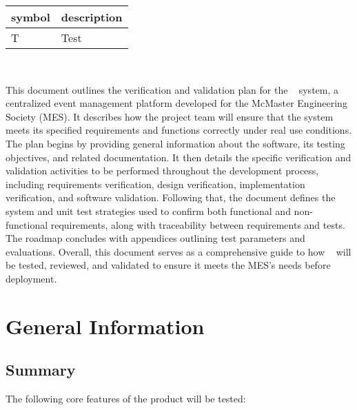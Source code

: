 \documentclass[12pt, titlepage]{article}
\begin{document}
\renewcommand{\arraystretch}{1.2}
\begin{tabular}{l l}
  \toprule
  \textbf{symbol} & \textbf{description}\\
  \midrule
  T & Test\\
  \bottomrule
\end{tabular}\\



\newpage


This document outlines the verification and validation plan for the \teamname~ system, a centralized event management
platform developed for the McMaster Engineering Society (MES). It describes how the project team will ensure that the
system meets its specified requirements and functions correctly under real use conditions. The plan begins by providing
general information about the software, its testing objectives, and related documentation. It then details the specific
verification and validation activities to be performed throughout the development process, including requirements
verification, design verification, implementation verification, and software validation. Following that, the document
defines the system and unit test strategies used to confirm both functional and non-functional requirements, along with
traceability between requirements and tests. The roadmap concludes with appendices outlining test parameters and
evaluations. Overall, this document serves as a comprehensive guide to how \teamname~ will be tested, reviewed, and
validated to ensure it meets the MES’s needs before deployment.

\section{General Information}

\subsection{Summary}

The following core features of the product will be tested:
\end{document}
